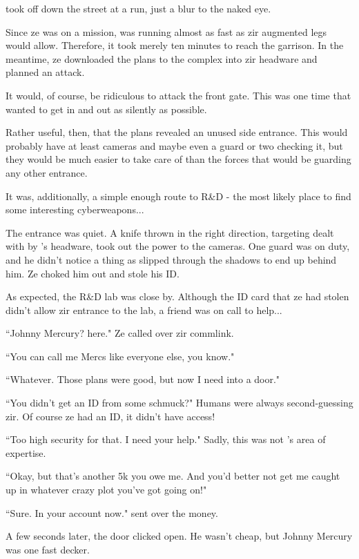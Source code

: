 \protagonist{} took off down the street at a run, just a blur to the naked eye.

Since ze was on a mission, \protagonist{} was running almost as fast as zir augmented legs would allow. Therefore, it took merely ten minutes to reach the garrison. In the meantime, ze downloaded the plans to the complex into zir headware and planned an attack.

It would, of course, be ridiculous to attack the front gate. This was one time that \protagonist{} wanted to get in and out as silently as possible.

Rather useful, then, that the plans revealed an unused side entrance. This would probably have at least cameras and maybe even a guard or two checking it, but they would be much easier to take care of than the forces that would be guarding any other entrance.

It was, additionally, a simple enough route to R\&D - the most likely place to find some interesting cyberweapons...

The entrance was quiet. A knife thrown in the right direction, targeting dealt with by \protagonist{}'s headware, took out the power to the cameras. One guard was on duty, and he didn't notice a thing as \protagonist{} slipped through the shadows to end up behind him. Ze choked him out and stole his ID.

As expected, the R\&D lab was close by. Although the ID card that ze had stolen didn't allow zir entrance to the lab, a friend was on call to help...

``Johnny Mercury? \protagonist{} here." Ze called over zir commlink.

``You can call me Mercs like everyone else, you know."

``Whatever. Those plans were good, but now I need into a door."

``You didn't get an ID from some schmuck?" Humans were always second-guessing zir. Of course ze had an ID, it didn't have access!

``Too high security for that. I need your help." Sadly, this was not \protagonist{}'s area of expertise.

``Okay, but that's another 5k you owe me. And you'd better not get me caught up in whatever crazy plot you've got going on!"

``Sure. In your account now." \protagonist{} sent over the money.

A few seconds later, the door clicked open. He wasn't cheap, but Johnny Mercury was one fast decker.

